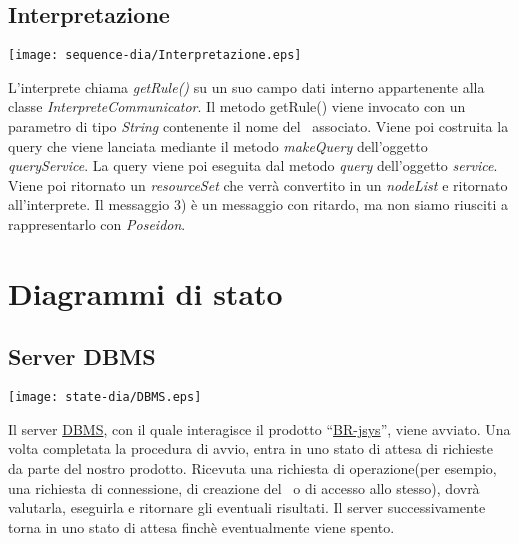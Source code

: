\subsection{Interpretazione}
\begin{center}
 \texttt{[image: sequence-dia/Interpretazione.eps]}
\end{center}
L'interprete chiama \textit{getRule()} su un suo campo dati interno appartenente alla classe \textit{InterpreteCommunicator}. Il metodo getRule() viene invocato con un parametro di tipo \textit{String} contenente il nome del \bo\ associato. Viene poi costruita la query che viene lanciata mediante il metodo \textit{makeQuery} dell'oggetto \textit{queryService}. La query viene poi eseguita dal metodo \textit{query} dell'oggetto \textit{service}. Viene poi ritornato un \textit{resourceSet} che verr\`a convertito in un \textit{nodeList} e ritornato all'interprete. Il messaggio 3) \`e un messaggio con ritardo, ma non siamo riusciti a rappresentarlo con \textit{Poseidon}.

\section{Diagrammi di stato}

\subsection{Server DBMS}
\begin{center}
 \texttt{[image: state-dia/DBMS.eps]}
\end{center}
Il server \underline{DBMS}, con il quale interagisce il prodotto ``\underline{BR-jsys}'', viene avviato. Una volta completata la procedura di avvio, entra in uno stato di attesa di richieste da parte del nostro prodotto. Ricevuta una richiesta di operazione(per esempio, una richiesta di connessione, di creazione del \rp\ o di accesso allo stesso), dovr\`a valutarla, eseguirla e ritornare gli eventuali risultati. Il server successivamente torna in uno stato di attesa finch\`e eventualmente viene spento.

